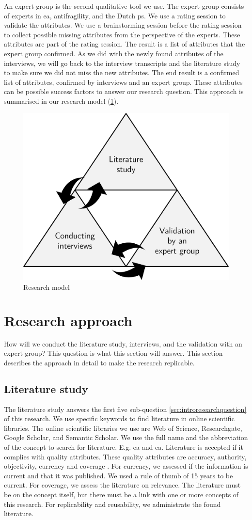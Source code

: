 An expert group is the second qualitative tool we use. The expert group consists of experts in \gls{ea}, \gls{antifragility}, and the Dutch \gls{ps}. We use a rating  session to validate the \glspl{attribute}. We use a brainstorming session before the rating session to collect possible missing \glspl{attribute} from the perspective of the experts. These \glspl{attribute} are part of the rating session. The result is a list of \glspl{attribute} that the expert group confirmed. As we did with the newly found \glspl{attribute} of the interviews, we will go back to the interview transcripts and the literature study to make sure we did not miss the new attributes. The end result is a confirmed list of \glspl{attribute}, confirmed by interviews and an expert group. These attributes can be possible success factors to answer our research question. This approach is summarised in our research model (\cref{fig:researchmodel}).
\begin{figure}[H]
	\centering
	\includegraphics[width=0.45\linewidth]{images/researchmodel}
	\caption[Research model]{Research model}
	\label{fig:researchmodel}
\end{figure}

\section{Research approach}
\label{sec:researchapproach}
How will we conduct the literature study, interviews, and the validation with an expert group? This question is what this section will answer. This section describes the approach in detail to make the research replicable.
\subsection{Literature study}
\label{sub:literaturestudy}
The literature study answers the first five sub-question \cref{sec:introresearchquestion} of this research. We use specific keywords to find literature in online scientific libraries. The online scientific libraries we use are Web of Science, Researchgate, Google Scholar, and Semantic Scholar. We use the full name and the abbreviation of the concept to search for literature. E.g. \gls{ea} and \acrshort{ea}. Literature is accepted if it complies with quality \glspl{attribute}. These quality \glspl{attribute} are accuracy, authority, objectivity, currency and coverage \parencite{CityUniHongKong2021}. For currency, we assessed if the information is current and that it was published. We used a rule of thumb of 15 years to be current. For coverage, we assess the literature on relevance. The literature must be on the concept itself, but there must be a link with one or more concepts of this research. For replicability and reusability, we administrate the found literature.


